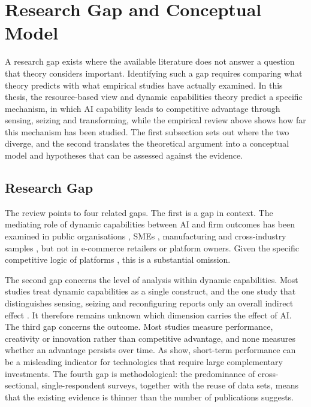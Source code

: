 \section{Research Gap and Conceptual Model}
\label{sec:gapmodel}

A research gap exists where the available literature does not answer a question that theory considers important. Identifying such a gap requires comparing what theory predicts with what empirical studies have actually examined. In this thesis, the resource-based view and dynamic capabilities theory predict a specific mechanism, in which AI capability leads to competitive advantage through sensing, seizing and transforming, while the empirical review above shows how far this mechanism has been studied. The first subsection sets out where the two diverge, and the second translates the theoretical argument into a conceptual model and hypotheses that can be assessed against the evidence.

\subsection{Research Gap}
\label{sec:gap}

The review points to four related gaps. The first is a gap in context. The mediating role of dynamic capabilities between AI and firm outcomes has been examined in public organisations \parencite{almheiri2025}, SMEs \parencite{aldhaheri2024, le2024}, manufacturing \parencite{aboufoul2023} and cross-industry samples \parencite{selgascors2026}, but not in e-commerce retailers or platform owners. Given the specific competitive logic of platforms \parencite{cennamo2021, rietveld2021}, this is a substantial omission.

The second gap concerns the level of analysis within dynamic capabilities. Most studies treat dynamic capabilities as a single construct, and the one study that distinguishes sensing, seizing and reconfiguring reports only an overall indirect effect \parencite{selgascors2026}. It therefore remains unknown which dimension carries the effect of AI. The third gap concerns the outcome. Most studies measure performance, creativity or innovation rather than competitive advantage, and none measures whether an advantage persists over time. As \textcite{brynjolfsson2021} show, short-term performance can be a misleading indicator for technologies that require large complementary investments. The fourth gap is methodological: the predominance of cross-sectional, single-respondent surveys, together with the reuse of data sets, means that the existing evidence is thinner than the number of publications suggests.

